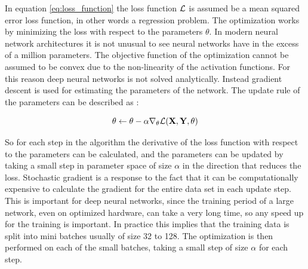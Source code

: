 In equation \eqref{eq:loss_function} the loss function $\mathcal{L}$ is assumed be a mean squared error loss function, in other words a regression problem. The optimization works by minimizing the loss with respect to the parameters $\theta$. In modern neural network architectures it is not unusual to see neural networks have in the excess of a million parameters. The objective function of the optimization cannot be assumed to be convex due to the non-linearity of the activation functions. For this reason deep neural networks is not solved analytically. Instead gradient descent is used for estimating the parameters of the network. The update rule of the parameters can be described as \parencite{goodfellow_deep_2016}:

\begin{equation}
    \theta \leftarrow \theta - \alpha \nabla_{\theta} \mathcal{L}(\textbf{X}, \textbf{Y}, \theta)
\end{equation}

So for each step in the algorithm the derivative of the loss function with respect to the parameters can be calculated, and the parameters can be updated by taking a small step in parameter space of size $\alpha$ in the direction that reduces the loss. Stochastic gradient is a response to the fact that it can be computationally expensive to calculate the gradient for the entire data set in each update step. This is important for deep neural networks, since the training period of a large network, even on optimized hardware, can take a very long time, so any speed up for the training is important. In practice this implies that the training data is split into mini batches usually of size 32 to 128. The optimization is then performed on each of the small batches, taking a small step of size $\alpha$ for each step.


